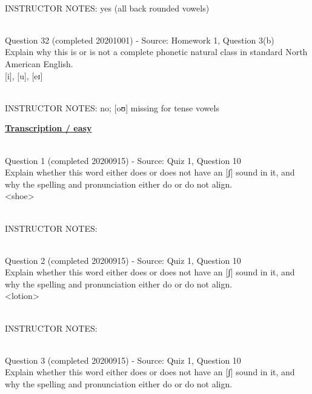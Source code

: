 \documentclass[12pt]{article}
\begin{document}
~\\
INSTRUCTOR NOTES: yes (all back rounded vowels)


~\\

{\large Question 32} (completed 20201001) - Source: Homework 1, Question 3(b)\\

Explain why this is or is not a complete phonetic natural class in standard North American English.\\

{[i]}, {[u]}, {[eɪ]}


~\\
INSTRUCTOR NOTES: no; [oʊ] missing for tense vowels


\newpage\textbf{\underline{\huge Transcription / easy\\}}

~\\

{\large Question 1} (completed 20200915) - Source: Quiz 1, Question 10\\

Explain whether this word either does or does not have an [ʃ] sound in it, and why the spelling and pronunciation either do or do not align.\\

<shoe>


~\\
INSTRUCTOR NOTES: 


~\\

{\large Question 2} (completed 20200915) - Source: Quiz 1, Question 10\\

Explain whether this word either does or does not have an [ʃ] sound in it, and why the spelling and pronunciation either do or do not align.\\

<lotion>


~\\
INSTRUCTOR NOTES: 


~\\

{\large Question 3} (completed 20200915) - Source: Quiz 1, Question 10\\

Explain whether this word either does or does not have an [ʃ] sound in it, and why the spelling and pronunciation either do or do not align.\\
\end{document}
